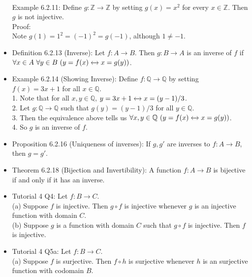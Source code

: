 \documentclass{article}
\begin{document}
\begin{itemize}
        \bigskip
        \\ Example 6.2.11: Define $g: \mathbb{Z} \xrightarrow{} \mathbb{Z}$ by setting $g(x)=x^2$ for every $x\in \mathbb{Z}$. Then $g$ is not injective.
        \bigskip
        \\ Proof:
        \\ \hspace*{3mm} Note $g(1) = 1^2 = (-1)^2 = g(-1)$, although $1 \neq -1$.
    \item Definition 6.2.13 (Inverse): Let $f:A \xrightarrow{} B$. Then $g:B\xrightarrow{}A$ is an inverse of $f$ if $\forall x\in A\ \forall y\in B\ (y=f(x) \xleftrightarrow{} x=g(y))$.
    \item Example 6.2.14 (Showing Inverse): Define $f:\mathbb{Q} \xrightarrow{} \mathbb{Q}$ by setting $f(x)=3x+1$ for all $x\in \mathbb{Q}$.
        \bigskip
        \\ \hspace*{3mm} 1. Note that for all $x,y\in \mathbb{Q}$, $y=3x+1 \xleftrightarrow{} x=(y-1)/3$.
        \\ \hspace*{3mm} 2. Let $g:\mathbb{Q} \xrightarrow{} \mathbb{Q}$ such that $g(y)=(y-1)/3$ for all $y\in \mathbb{Q}$.
        \\ \hspace*{3mm} 3. Then the equivalence above tells us $\forall x,y\in \mathbb{Q}\ (y=f(x) \xleftrightarrow{} x=g(y))$.
        \\ \hspace*{3mm} 4. So $g$ is an inverse of $f$.
    \item Proposition 6.2.16 (Uniqueness of inverses): If $g,g'$ are inverses to $f:A\xrightarrow{}B$, then $g=g'$.
    \item Theorem 6.2.18 (Bijection and Invertibility): A function $f:A\xrightarrow{}B$ is bijective if and only if it has an inverse.
    \item Tutorial 4 Q4: Let $f:B \xrightarrow{} C$.
        \\ \hspace*{3mm} (a) Suppose $f$ is injective. Then $g \circ f$ is injective whenever $g$ is an injective function with domain $C$.
        \\ \hspace*{3mm} (b) Suppose $g$ is a function with domain $C$ such that $g \circ f$ is injective. Then $f$ is injective.
    \item Tutorial 4 Q5a: Let $f:B \xrightarrow{} C$. 
        \\ \hspace*{3mm} (a) Suppose $f$ is surjective. Then $f \circ h$ is surjective whenever $h$ is an surjective function with codomain $B$.

\end{itemize}
\end{document}
